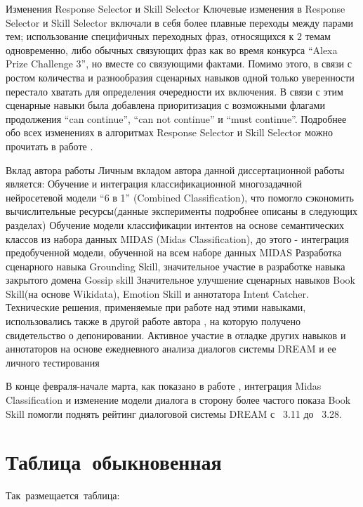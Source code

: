 Изменения Response Selector и Skill Selector
Ключевые изменения в Response Selector и Skill Selector включали в себя более плавные переходы между парами тем; использование специфичных переходных фраз, относящихся к 2 темам одновременно, либо обычных связующих фраз как во время конкурса “Alexa Prize Challenge 3”, но вместе со связующими фактами. 
Помимо этого, в связи с ростом количества и разнообразия сценарных навыков одной только уверенности перестало хватать для определения очередности их включения. В связи с этим сценарные навыки была добавлена приоритизация с возможными флагами продолжения “can continue”, “can not continue” и “must continue”.
Подробнее обо всех изменениях в алгоритмах Response Selector и Skill Selector можно прочитать в работе \cite{Баймурзина_2021}.


Вклад автора работы
Личным вкладом автора данной диссертационной работы является:
Обучение и интеграция классификационной многозадачной нейросетевой модели “6 в 1” (Combined Classification), что помогло сэкономить вычислительные ресурсы(данные эксперименты подробнее описаны в следующих разделах)
Обучение модели классификации интентов на основе семантических классов из набора данных MIDAS (Midas Classification), до этого - интеграция предобученной модели, обученной на всем наборе данных MIDAS
Разработка сценарного навыка Grounding Skill, значительное участие в разработке навыка закрытого домена Gossip skill
Значительное улучшение сценарных навыков Book Skill(на основе Wikidata), Emotion Skill и аннотатора Intent Catcher. Технические решения, применяемые при работе над этими навыками, использовались также в другой работе автора \cite{Дуплякин_Дмитрий_Ондар_Ушаков_2021}, на которую получено свидетельство о депонировании.
Активное участие в отладке других навыков и аннотаторов на основе ежедневного анализа диалогов системы DREAM и ее личного тестирования

В конце февраля-начале марта, как показано  в работе \cite{Baymurzina_Kuznetsov_Evseev_Karpov_Sagirova_Peganov_Ignatov_Ermakova_Cherniavskii_Kumeyko_et al._2021}, интеграция Midas Classification и изменение модели диалога в сторону более частого показа Book Skill помогли поднять рейтинг диалоговой системы DREAM с ~3.11 до ~3.28. 


 \section{Таблица обыкновенная}\label{sec:ch3/sect1} 
  
 Так размещается таблица: 
  
